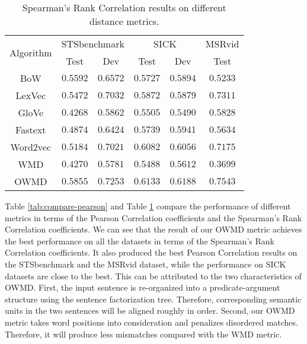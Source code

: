 \begin{table}[tb]
  \caption{Spearman's Rank Correlation results on different distance metrics.}
  \label{tab:compare-spearman}
  \begin{tabular}{c|cc|cc|c}
    \toprule
    \multirow{2}{*}{Algorithm} & \multicolumn{2}{c}{STSbenchmark} & \multicolumn{2}{c}{SICK} & MSRvid\\ 
     & Test & Dev & Test & Dev & Test\\
    \midrule
    BoW & $0.5592$ & $0.6572$ & $0.5727$ & $0.5894$ & $0.5233$ \\
    LexVec & $0.5472$ & $0.7032$ & $0.5872$ & $0.5879$ & $0.7311$\\
    GloVe & $0.4268$ & $0.5862$ & $0.5505$ & $0.5490$  & $0.5828$ \\
    Fastext & $0.4874$ & $0.6424$ & $0.5739$ & $0.5941$  & $0.5634$  \\
    Word2vec & $0.5184$ & $0.7021$ & $0.6082$ & $0.6056$  & $0.7175$  \\
    WMD & $0.4270$ & $0.5781$ & $0.5488$ & $0.5612$  & $0.3699$  \\
    OWMD & $\mathbf{0.5855}$ & $\mathbf{0.7253}$ & $\mathbf{0.6133}$ & $\mathbf{0.6188}$  & $\mathbf{0.7543}$  \\
    \bottomrule
  \end{tabular}
  \vspace{-2mm}
\end{table}


Table \ref{tab:compare-pearson} and Table \ref{tab:compare-spearman} compare the performance of different metrics in terms of the Pearson Correlation coefficients and the Spearman's Rank Correlation coefficients.
We can see that the result of our OWMD metric achieves the best performance on all the datasets in terms of the Spearman's Rank Correlation coefficients.
It also produced the best Pearson Correlation results on the STSbenchmark and the MSRvid dataset, while the performance on SICK datasets are close to the best.
This can be attributed to the two characteristics of OWMD. First, the input sentence is re-organized into a predicate-argument structure using the sentence factorization tree. Therefore, corresponding semantic units in the two sentences will be aligned roughly in order. Second, our OWMD metric takes word positions into consideration and penalizes disordered matches. Therefore, it will produce less mismatches compared with the WMD metric.


